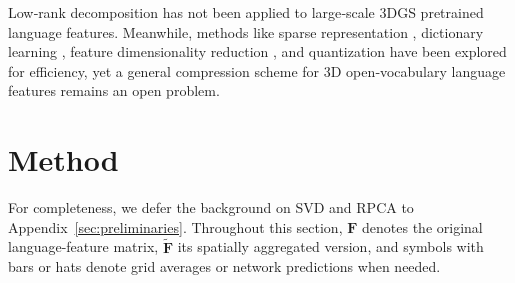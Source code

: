 \documentclass{article}
\begin{document}
Low‑rank decomposition has not been applied to large‑scale 3DGS pretrained language features. Meanwhile, methods like sparse representation \cite{li2025langsplatv2}, dictionary learning \cite{wu2024opengaussian}, feature dimensionality reduction \cite{cheng2024occamslgssimpleapproach}, and quantization \cite{drsplat25} have been explored for efficiency, yet a general compression scheme for 3D open‑vocabulary language features remains an open problem.

\section{Method}
\label{sec:method}
For completeness, we defer the background on SVD and RPCA to Appendix~\ref{sec:preliminaries}. Throughout this section, $\mathbf{F}$ denotes the original language-feature matrix, $\tilde{\mathbf{F}}$ its spatially aggregated version, and symbols with bars or hats denote grid averages or network predictions when needed.
\end{document}
